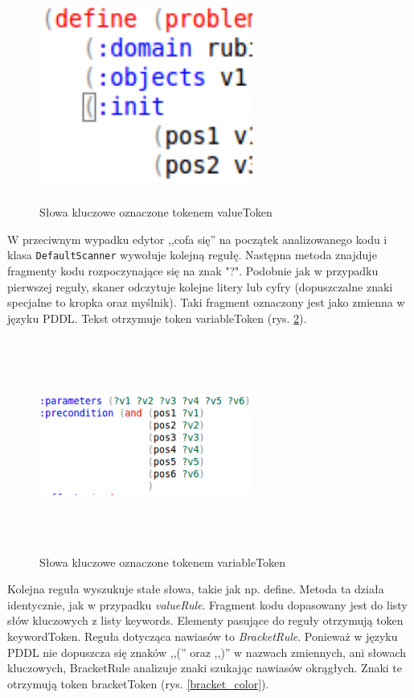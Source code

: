 \begin{figure}[h]
  \centering
    \includegraphics[width=7cm,height=7cm,keepaspectratio]{img/values-color.png}
    \caption{Słowa kluczowe oznaczone tokenem valueToken}
    \label{values_color}
\end{figure}

 W przeciwnym wypadku edytor ,,cofa się'' na początek analizowanego kodu i klasa \texttt{DefaultScanner} wywołuje kolejną regułę. Następna metoda znajduje fragmenty kodu rozpoczynające się na znak "?".  Podobnie jak w przypadku pierwszej reguły, skaner odczytuje kolejne litery lub cyfry (dopuszczalne znaki specjalne to kropka oraz myślnik). Taki fragment oznaczony jest jako zmienna w języku PDDL. Tekst otrzymuje token variableToken (rys. \ref{variable_color}).

\begin{figure}[h]
  \centering
    \includegraphics[width=7cm,height=7cm,keepaspectratio]{img/variable-color.png}
    \caption{Słowa kluczowe oznaczone tokenem variableToken}
    \label{variable_color}
\end{figure}

Kolejna reguła wyszukuje stałe słowa, takie jak np. define. Metoda ta działa identycznie, jak w przypadku \emph{valueRule}. Fragment kodu dopasowany jest do listy słów kluczowych z listy keywords. Elementy pasujące do reguły otrzymują token keywordToken. Reguła dotycząca nawiasów to \emph{BracketRule}. Ponieważ w języku PDDL nie dopuszcza się znaków ,,('' oraz ,,)'' w nazwach zmiennych, ani słowach kluczowych, BracketRule analizuje znaki szukając nawiasów okrągłych. Znaki te otrzymują token bracketToken (rys. \ref{bracket_color}).

